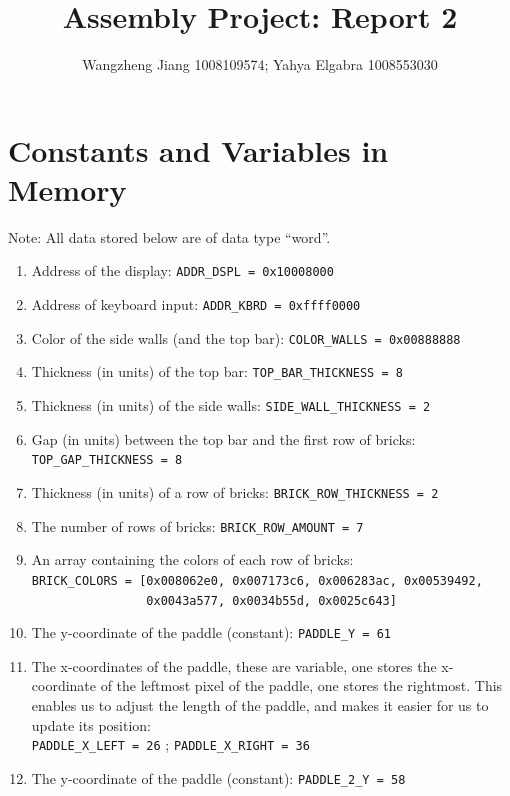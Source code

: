 \documentclass[11pt]{article}
\title{Assembly Project: Report 2}
\author{Wangzheng Jiang 1008109574; Yahya Elgabra 1008553030}
\begin{document}
\maketitle

\section{Constants and Variables in Memory}

Note: All data stored below are of data type ``word''.
\begin{enumerate}

\item Address of the display: \verb+ADDR_DSPL = 0x10008000+
\item Address of keyboard input: \verb+ADDR_KBRD = 0xffff0000+
\\
\item Color of the side walls (and the top bar): \verb+COLOR_WALLS = 0x00888888+
\item Thickness (in units) of the top bar: \verb+TOP_BAR_THICKNESS = 8+
\item Thickness (in units) of the side walls: \verb+SIDE_WALL_THICKNESS = 2+
\item Gap (in units) between the top bar and the first row of bricks: \verb+TOP_GAP_THICKNESS = 8+
\\
\item Thickness (in units) of a row of bricks: \verb+BRICK_ROW_THICKNESS = 2+
\item The number of rows of bricks: \verb+BRICK_ROW_AMOUNT = 7+
\item An array containing the colors of each row of bricks: \\ \verb+BRICK_COLORS = [0x008062e0, 0x007173c6, 0x006283ac, 0x00539492,+\\ \verb+                0x0043a577, 0x0034b55d, 0x0025c643]+
\\
\item The y-coordinate of the paddle (constant): \verb+PADDLE_Y = 61+
\item The x-coordinates of the paddle, these are variable, one stores the x-coordinate of the leftmost pixel of the paddle, one stores the rightmost. This enables us to adjust the length of the paddle, and makes it easier for us to update its position:\\ \verb+PADDLE_X_LEFT = 26+ ; \verb+PADDLE_X_RIGHT = 36+
\\
\item The y-coordinate of the paddle (constant): \verb+PADDLE_2_Y = 58+

\end{enumerate}
\end{document}
